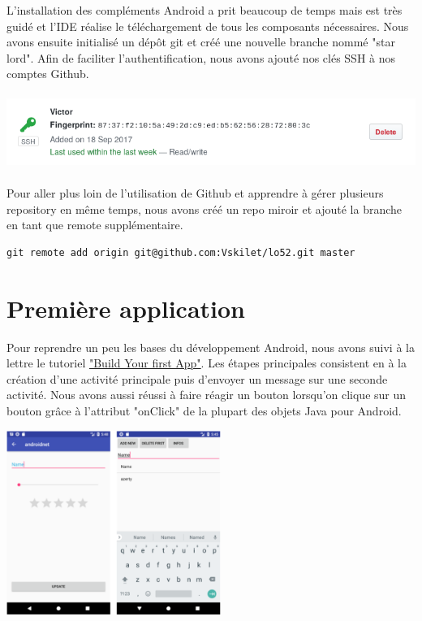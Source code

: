 \documentclass{ipfwpaper}
\begin{document}
L'installation des compléments Android a prit beaucoup de temps mais est très guidé et l'IDE réalise le téléchargement de tous les composants nécessaires.
Nous avons ensuite initialisé un dépôt git et créé une nouvelle branche nommé "star lord".
Afin de faciliter l'authentification, nous avons ajouté nos clés SSH à nos comptes Github.

\begin{center}
\includegraphics[height=2.5cm]{img/screenshot_ssh.png}
\end{center}

Pour aller plus loin de l'utilisation de Github et apprendre à gérer plusieurs repository en même temps, nous avons créé un repo miroir et ajouté la branche en tant que remote supplémentaire.
\begin{lstlisting}
git remote add origin git@github.com:Vskilet/lo52.git master
\end{lstlisting}

\section{Première application}
Pour reprendre un peu les bases du développement Android, nous avons suivi à la lettre le tutoriel \href{https://developer.android.com/training/basics/firstapp/index.html}{"Build Your first App"}. Les étapes principales consistent en à la création d'une activité principale puis d'envoyer un message sur une seconde activité. Nous avons aussi réussi à faire réagir un bouton lorsqu'on clique sur un bouton grâce à l'attribut "onClick" de la plupart des objets Java pour Android. 

\begin{center}
\includegraphics[height=6cm]{img/androidsqlitedatabase.png}
\end{center}
\end{document}
